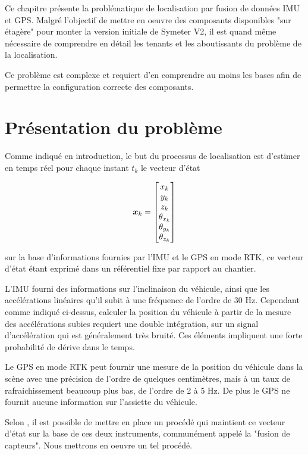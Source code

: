 \documentclass[12pt,a4paper]{report}
\begin{document}
Ce chapitre présente la problématique de localisation par fusion de données IMU et GPS. Malgré l'objectif de mettre en oeuvre des composants disponibles "sur étagère" pour monter la version initiale de Symeter V2, il est quand même nécessaire de comprendre en détail les tenants et les aboutissants du problème de la localisation.

\para Ce problème est complexe et requiert d'en comprendre au moins les bases afin de permettre la configuration correcte des composants.

	\section{Présentation du problème}
	Comme indiqué en introduction, le but du processus de localisation est d'estimer en temps réel pour chaque instant $t_k$ le vecteur d'état 
	
	\begin{equation}	
	\boldsymbol{x}_k = \begin{bmatrix}
	x_k \\ y_k \\ z_k \\ \theta_{x_k} \\ \theta_{y_k} \\ \theta_{z_k}
	\end{bmatrix}
	\end{equation}
	\newline
	
	sur la base d'informations fournies par l'IMU et le GPS en mode RTK, ce vecteur d'état étant exprimé dans un référentiel fixe par rapport au chantier.
	
	\para L'IMU fourni des informations sur l'inclinaison du véhicule, ainsi que les accélérations linéaires qu'il subit à une fréquence de l'ordre de 30 Hz. Cependant comme indiqué ci-dessus, calculer la position du véhicule à partir de la mesure des accélérations subies requiert une double intégration, sur un signal d'accélération qui est généralement très bruité. Ces éléments impliquent une forte probabilité de dérive dans le temps.
	
	\para Le GPS en mode RTK peut fournir une mesure de la position du véhicule dans la scène avec une précision de l'ordre de quelques centimètres, mais à un taux de rafraichissement beaucoup plus bas, de l'ordre de 2 à 5 Hz. De plus le GPS ne fournit aucune information sur l'assiette du véhicule.
	
	\para Selon \cite{gustavsson_uav_2015}, il est possible de mettre en place un procédé qui maintient ce vecteur d'état sur la base de ces deux instruments, communément appelé la "fusion de capteurs". Nous mettrons en oeuvre un tel procédé.
	
\end{document}

